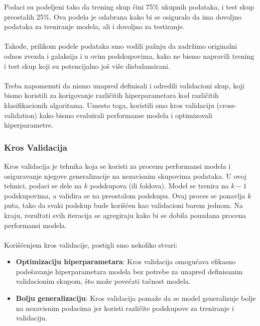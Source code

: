 \documentclass[a4paper,12pt]{article}
\begin{document}
Podaci su podeljeni tako da trening skup čini 75\% ukupnih podataka, i test skup preostalih 25\%. Ova podela je odabrana kako bi se osiguralo da ima dovoljno podataka za treniranje modela, ali i dovoljno za testiranje.\\\\
Takođe, prilikom podele podataka smo vodili pažnju da zadržimo originalni odnos zvezda i galaksija i u ovim podskupovima, kako ne bismo napravili trening i test skup koji su potencijalno još više disbalansirani.\\\\
Treba napomenuti da nismo unapred definisali i odredili validacioni skup, koji bismo koristili za korigovanje različitih hiperparametara kod različitih klasifikacionih algoritama. Umesto toga, koristili smo kros validaciju (cross-validation) kako bismo evaluirali performanse modela i optimizovali hiperparametre.

\subsubsection{Kros Validacija}
Kros validacija je tehnika koja se koristi za procenu performansi modela i osiguravanje njegove generalizacije na nezavisnim skupovima podataka. U ovoj tehnici, podaci se dele na $k$ podskupova (ili foldova). Model se trenira na $k-1$ podskupovima, a validira se na preostalom podskupu. Ovaj proces se ponavlja $k$ puta, tako da svaki podskup bude korišćen kao validacioni barem jednom. Na kraju, rezultati svih iteracija se agregiraju kako bi se dobila pouzdana procena performansi modela.\\\\
Korišćenjem kros validacije, postigli smo nekoliko stvari:
\begin{itemize}
    \item \textbf{Optimizaciju hiperparametara}: Kros validacija omogućava efikasno podešavanje hiperparametara modela bez potrebe za unapred definisanim validacionim skupom, što može povećati tačnost modela.
    \item \textbf{Bolju generalizaciju}: Kros validacija pomaže da se model generalizuje bolje na nezavisnim podacima jer koristi različite podskupove za treniranje i validaciju.
\end{itemize}
\end{document}
